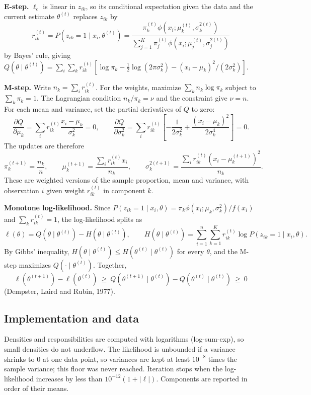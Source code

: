 \documentclass[11pt]{article}
\begin{document}
\textbf{E-step.} $\ell_c$ is linear in $z_{ik}$, so its conditional expectation given the data and the current
estimate $\theta^{(t)}$ replaces $z_{ik}$ by
\[
r_{ik}^{(t)}=P(z_{ik}=1\mid x_i,\theta^{(t)})
=\frac{\pi_k^{(t)}\phi(x_i;\mu_k^{(t)},\sigma_k^{2(t)})}{\sum_{j=1}^K\pi_j^{(t)}\phi(x_i;\mu_j^{(t)},\sigma_j^{2(t)})}
\]
by Bayes' rule, giving
$Q(\theta\mid\theta^{(t)})=\sum_i\sum_k r_{ik}^{(t)}\left[\log\pi_k-\tfrac12\log(2\pi\sigma_k^2)
-(x_i-\mu_k)^2/(2\sigma_k^2)\right]$.

\textbf{M-step.} Write $n_k=\sum_i r_{ik}^{(t)}$. For the weights, maximize $\sum_k n_k\log\pi_k$ subject to
$\sum_k\pi_k=1$. The Lagrangian condition $n_k/\pi_k=\nu$ and the constraint give $\nu=n$. For each mean and
variance, set the partial derivatives of $Q$ to zero:
\[
\frac{\partial Q}{\partial\mu_k}=\sum_i r_{ik}^{(t)}\frac{x_i-\mu_k}{\sigma_k^2}=0,
\qquad
\frac{\partial Q}{\partial\sigma_k^2}=\sum_i r_{ik}^{(t)}\left[-\frac{1}{2\sigma_k^2}+\frac{(x_i-\mu_k)^2}{2\sigma_k^4}\right]=0 .
\]
The updates are therefore
\[
\pi_k^{(t+1)}=\frac{n_k}{n},\qquad
\mu_k^{(t+1)}=\frac{\sum_i r_{ik}^{(t)}x_i}{n_k},\qquad
\sigma_k^{2(t+1)}=\frac{\sum_i r_{ik}^{(t)}\left(x_i-\mu_k^{(t+1)}\right)^2}{n_k}.
\]
These are weighted versions of the sample proportion, mean and variance, with observation $i$ given weight
$r_{ik}^{(t)}$ in component $k$.

\textbf{Monotone log-likelihood.} Since $P(z_{ik}=1\mid x_i,\theta)=\pi_k\phi(x_i;\mu_k,\sigma_k^2)/f(x_i)$ and
$\sum_k r_{ik}^{(t)}=1$, the log-likelihood splits as
\[
\ell(\theta)=Q(\theta\mid\theta^{(t)})-H(\theta\mid\theta^{(t)}),\qquad
H(\theta\mid\theta^{(t)})=\sum_{i=1}^n\sum_{k=1}^K r_{ik}^{(t)}\log P(z_{ik}=1\mid x_i,\theta).
\]
By Gibbs' inequality, $H(\theta\mid\theta^{(t)})\le H(\theta^{(t)}\mid\theta^{(t)})$ for every $\theta$, and the
M-step maximizes $Q(\cdot\mid\theta^{(t)})$. Together,
\[
\ell(\theta^{(t+1)})-\ell(\theta^{(t)})\ \ge\ Q(\theta^{(t+1)}\mid\theta^{(t)})-Q(\theta^{(t)}\mid\theta^{(t)})\ \ge\ 0
\]
(Dempster, Laird and Rubin, 1977).

\subsection*{Implementation and data}

Densities and responsibilities are computed with logarithms (log-sum-exp), so small densities do not underflow.
The likelihood is unbounded if a variance shrinks to 0 at one data point, so variances are kept at least
$10^{-8}$ times the sample variance; this floor was never reached. Iteration stops when the log-likelihood
increases by less than $10^{-12}(1+|\ell|)$. Components are reported in order of their means.
\end{document}
